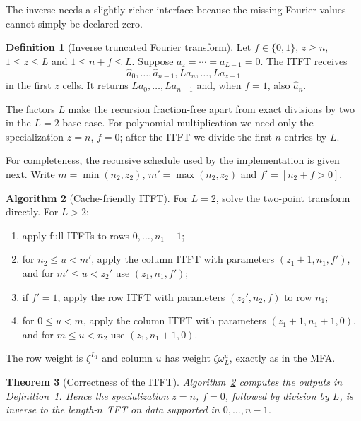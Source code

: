 \documentclass[11pt]{book}
\newtheorem{theorem}{Theorem}[section]
\theoremstyle{definition}
\newtheorem{algorithm}[theorem]{Algorithm}
\newtheorem{definition}[theorem]{Definition}
\begin{document}
The inverse needs a slightly richer interface because the missing Fourier
values cannot simply be declared zero.

\begin{definition}[Inverse truncated Fourier transform]
\label{def:itft}
Let $f\in\{0,1\}$, $z\geq n$, $1\leq z\leq L$ and
$1\leq n+f\leq L$.  Suppose $a_z=\cdots=a_{L-1}=0$.  The ITFT receives
\[
 \widehat a_0,\ldots,\widehat a_{n-1},
 La_n,\ldots,La_{z-1}
\]
in the first $z$ cells.  It returns $La_0,\ldots,La_{n-1}$ and, when $f=1$,
also $\widehat a_n$.
\end{definition}

The factors $L$ make the recursion fraction-free apart from exact divisions by
two in the $L=2$ base case.  For polynomial multiplication we need only the
specialization $z=n$, $f=0$; after the ITFT we divide the first $n$ entries by
$L$.

For completeness, the recursive schedule used by the implementation is given
next.  Write $m=\min(n_2,z_2)$, $m'=\max(n_2,z_2)$ and
$f'=[n_2+f>0]$.

\begin{algorithm}[Cache-friendly ITFT]\label{alg:itft}
For $L=2$, solve the two-point transform directly.  For $L>2$:
\begin{enumerate}
 \item apply full ITFTs to rows $0,\ldots,n_1-1$;
 \item for $n_2\leq u<m'$, apply the column ITFT with parameters
 $(z_1+1,n_1,f')$, and for $m'\leq u<z_2'$ use $(z_1,n_1,f')$;
 \item if $f'=1$, apply the row ITFT with parameters $(z_2',n_2,f)$ to row
 $n_1$;
 \item for $0\leq u<m$, apply the column ITFT with parameters
 $(z_1+1,n_1+1,0)$, and for $m\leq u<n_2$ use $(z_1,n_1+1,0)$.
\end{enumerate}
The row weight is $\zeta^{L_1}$ and column $u$ has weight
$\zeta\omega_L^u$, exactly as in the MFA.
\end{algorithm}

\begin{theorem}[Correctness of the ITFT]\label{thm:itft-correct}
Algorithm~\ref{alg:itft} computes the outputs in
Definition~\ref{def:itft}.  Hence the specialization $z=n$, $f=0$, followed
by division by $L$, is inverse to the length-$n$ TFT on data supported in
$0,\ldots,n-1$.
\end{theorem}
\end{document}
